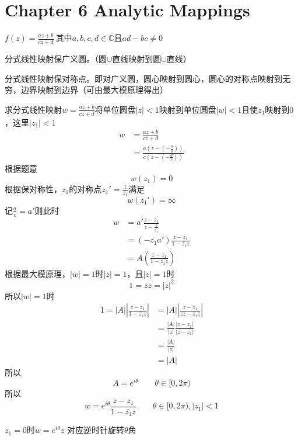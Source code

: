 \section{Chapter 6 Analytic Mappings}
\begin{definition*}
    $f(z)=\frac{az+b}{cz+d}~$其中$a,b,c,d\in\mathbb{C}$且$ad-bc\neq0$
\end{definition*}
\begin{theorem*}
    分式线性映射保广义圆。（圆$\cup$直线映射到圆$\cup$直线）
\end{theorem*}
\begin{theorem*}
    分式线性映射保对称点。即对广义圆，圆心映射到圆心，圆心的对称点映射到无穷，边界映射到边界（可由最大模原理得出）
\end{theorem*}
\begin{homeworkProblem}
求分式线性映射$w=\frac{az+b}{cz+d}$将单位圆盘$|z|<1$映射到单位圆盘$|w|<1$且使$z_1$映射到$0$，这里$|z_1|<1$
\newline
\solution
\[\begin{split}
w &= \frac{az+b}{cz+d}\\
&= \frac{a(z-(-\frac{b}{a}))}{c(z-(-\frac{d}{c}))}
\end{split}\]
根据题意\[w(z_1)=0\]
根据保对称性，$z_1$的对称点$z_1'=\frac{1}{\overline{z_1}}$满足
\[w(z_1')=\infty\]
记$\frac{a}{c}=a'$则此时
\[
\begin{array}{ll}
w &= a'\frac{z-z_1}{z-\frac{1}{\overline{z_1}}} \\
&= (-\overline{z_1}a')\frac{z-z_1}{1-\overline{z_1}z} \\
&= A(\frac{z-z_1}{1-\overline{z_1}z})
\end{array}
\]
根据最大模原理，$|w|=1$时$|z|=1$，且$|z|=1$时
\[
1=\overline{z}z=|z|^2
\]
所以$|w|=1$时
\[
\begin{split}
    1 = |A|\left|\frac{z-z_1}{1-\overline{z_1}z}\right| &= |A|\left|\frac{z-z_1}{z\overline{z}-\overline{z_1}z}\right| \\
    &= \frac{|A|}{|z|}\frac{|z-z_1|}{|\overline{z}-\overline{z_1}|} \\
    &= \frac{|A|}{|z|}\\
    &= |A|
\end{split}
\]
所以
\[
A = e^{i\theta} \qquad \theta\in[0, 2\pi)
\]
所以
\[
 w = e^{i\theta}\frac{z-z_1}{1-\overline{z_1}z} \qquad \theta\in[0,2\pi),|z_1|<1
\]
\end{homeworkProblem}
\begin{corollary*}
 $z_1=0$时$w = e^{i\theta}z$ 对应逆时针旋转$\theta$角
\end{corollary*}
